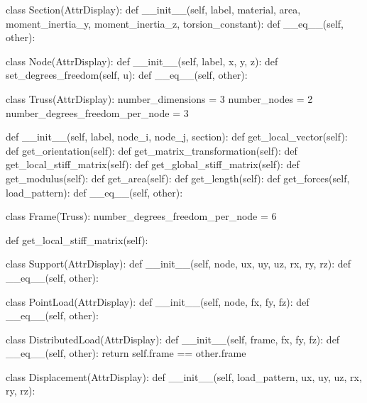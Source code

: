 \begin{codigoprog}
class Section(AttrDisplay):
    def __init__(self, label, material, area, moment_inertia_y, moment_inertia_z, torsion_constant):
    def __eq__(self, other):
\end{codigoprog}

\begin{codigoprog}
class Node(AttrDisplay):
    def __init__(self, label, x, y, z):
    def set_degrees_freedom(self, u):
    def __eq__(self, other):
\end{codigoprog}

\begin{codigoprog}
class Truss(AttrDisplay):
    number_dimensions = 3
    number_nodes = 2
    number_degrees_freedom_per_node = 3

    def __init__(self, label, node_i, node_j, section):
    def get_local_vector(self):
    def get_orientation(self):
    def get_matrix_transformation(self):
    def get_local_stiff_matrix(self):
    def get_global_stiff_matrix(self):
    def get_modulus(self):
    def get_area(self):
    def get_length(self):
    def get_forces(self, load_pattern):
    def __eq__(self, other):
\end{codigoprog}

\begin{codigoprog}
class Frame(Truss):
    number_degrees_freedom_per_node = 6
    
    def get_local_stiff_matrix(self):
\end{codigoprog}

\begin{codigoprog}
class Support(AttrDisplay):
    def __init__(self, node, ux, uy, uz, rx, ry, rz):
    def __eq__(self, other):
\end{codigoprog}

\begin{codigoprog}
class PointLoad(AttrDisplay):
    def __init__(self, node, fx, fy, fz):
    def __eq__(self, other):
\end{codigoprog}

\begin{codigoprog}
class DistributedLoad(AttrDisplay):
    def __init__(self, frame, fx, fy, fz):
    def __eq__(self, other):
        return self.frame == other.frame
\end{codigoprog}

\begin{codigoprog}
class Displacement(AttrDisplay):
    def __init__(self, load_pattern, ux, uy, uz, rx, ry, rz):
\end{codigoprog}

